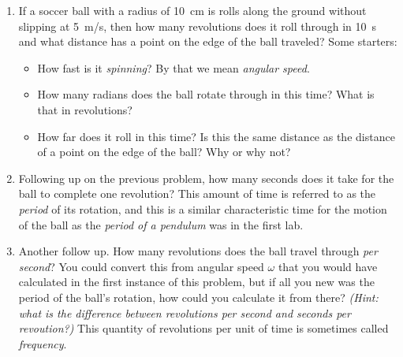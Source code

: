 \begin{enumerate}
%

\item If a soccer ball with a radius of \SI{10}{\centi\meter} is rolls along the ground without slipping at \SI{5}{m/s}, then how many revolutions does it roll through in \SI{10}{\second} and what distance has a point on the edge of the ball traveled?
Some starters:
\begin{itemize}
	\item How fast is it \emph{spinning}? By that we mean \emph{angular speed}.
	\item How many radians does the ball rotate through in this time? What is that in revolutions?
	\item How far does it roll in this time? Is this the same distance as the distance of a point on the edge of the ball? Why or why not?
\end{itemize}
\hugeskip

\item
Following up on the previous problem, how many seconds does it take for the ball to complete one revolution? This amount of time is referred to as the \emph{period} of its rotation, and this is a similar characteristic time for the motion of the ball as the \emph{period of a pendulum} was in the first lab.

\item 
Another follow up. How many revolutions does the ball travel through \emph{per second}? You could convert this from angular speed $\omega$ that you would have calculated in the first instance of this problem, but if all you new was the period of the ball's rotation, how could you calculate it from there? \emph{(Hint: what is the difference between revolutions per second and seconds per revoution?)} This quantity of revolutions per unit of time is sometimes called \emph{frequency}.


\end{enumerate}
